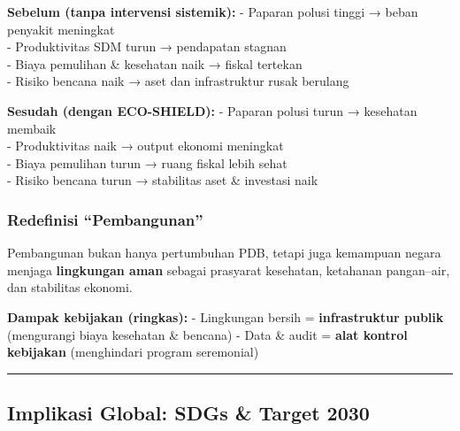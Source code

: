 \documentclass[
  letterpaper,
  DIV=11,
  numbers=noendperiod]{scrreprt}
\begin{document}
\textbf{Sebelum (tanpa intervensi sistemik):} - Paparan polusi tinggi →
beban penyakit meningkat\\
- Produktivitas SDM turun → pendapatan stagnan\\
- Biaya pemulihan \& kesehatan naik → fiskal tertekan\\
- Risiko bencana naik → aset dan infrastruktur rusak berulang

\textbf{Sesudah (dengan ECO-SHIELD):} - Paparan polusi turun → kesehatan
membaik\\
- Produktivitas naik → output ekonomi meningkat\\
- Biaya pemulihan turun → ruang fiskal lebih sehat\\
- Risiko bencana turun → stabilitas aset \& investasi naik

\subsubsection{Redefinisi ``Pembangunan''}\label{redefinisi-pembangunan}

\begin{tcolorbox}[enhanced jigsaw, colback=white, colframe=quarto-callout-important-color-frame, left=2mm, arc=.35mm, bottomrule=.15mm, opacityback=0, opacitybacktitle=0.6, coltitle=black, toprule=.15mm, colbacktitle=quarto-callout-important-color!10!white, breakable, titlerule=0mm, leftrule=.75mm, title=\textcolor{quarto-callout-important-color}{\faExclamation}\hspace{0.5em}{Important}, toptitle=1mm, bottomtitle=1mm, rightrule=.15mm]

Pembangunan bukan hanya pertumbuhan PDB, tetapi juga kemampuan negara
menjaga \textbf{lingkungan aman} sebagai prasyarat kesehatan, ketahanan
pangan--air, dan stabilitas ekonomi.

\end{tcolorbox}

\textbf{Dampak kebijakan (ringkas):} - Lingkungan bersih =
\textbf{infrastruktur publik} (mengurangi biaya kesehatan \& bencana) -
Data \& audit = \textbf{alat kontrol kebijakan} (menghindari program
seremonial)

\begin{center}\rule{0.5\linewidth}{0.5pt}\end{center}

\subsection{Implikasi Global: SDGs \& Target
2030}\label{implikasi-global-sdgs-target-2030}
\end{document}
